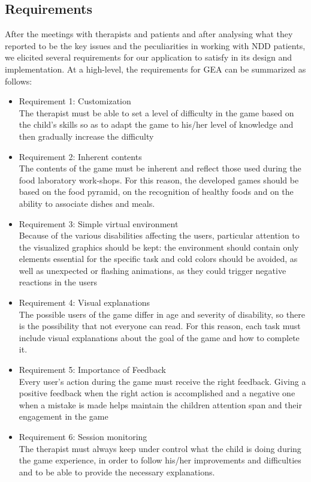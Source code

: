 \subsection{Requirements}
After the meetings with therapists and patients and after analysing what they reported to be the key issues and the peculiarities in working with NDD patients, we elicited several requirements for our application to satisfy in its design and implementation.
At a high-level, the requirements for GEA can be summarized as follows:
\begin{itemize}
\item Requirement 1: Customization\\
The therapist must be able to set a level of difficulty in the game based on the child's skills so as to  adapt the game to his/her level of knowledge and then gradually increase the difficulty
\item Requirement 2: Inherent contents\\
The contents of the game must be inherent and reflect those used during the food laboratory work-shops.  For this reason, the developed games should be based on the food pyramid, on the recognition of healthy foods and on the ability to associate dishes and meals.
\item Requirement 3: Simple virtual environment\\
Because of the various disabilities affecting the users, particular attention to the visualized graphics should be kept: the environment should contain only elements essential for the specific task and cold colors should be avoided, as well as unexpected or flashing animations, as they could trigger negative reactions in the users
\item Requirement 4: Visual explanations\\
The possible users of the game differ in age and severity of disability, so there is the possibility that not everyone can read. For this reason, each task must include visual explanations about the goal of the game and how to complete it.
\item Requirement 5: Importance of Feedback\\
Every user's action during the game must receive the right feedback. Giving a positive feedback when the right action is accomplished and a negative one when a mistake is made helps maintain the children attention span and their engagement in the game
\item Requirement 6: Session monitoring\\
The therapist must always keep under control what the child is doing during the game experience, in order to follow his/her improvements and difficulties and to be able to provide the necessary explanations.
\end{itemize}

